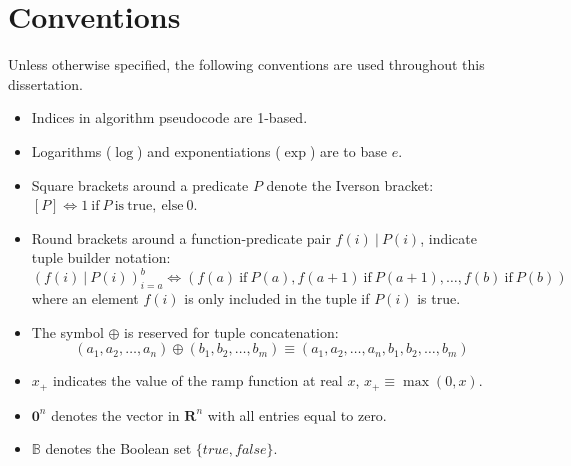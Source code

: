 \chapter*{Conventions}
Unless otherwise specified, the following conventions are used throughout this dissertation.

\begin{itemize}
  \item Indices in algorithm pseudocode are 1-based.
  \item Logarithms ($\log$) and exponentiations ($\exp$) are to base $e$.
  \item Square brackets around a predicate $P$ denote the Iverson bracket: $\left[P\right] \Leftrightarrow 1\ \mathrm{if}\ P \mathrm{~is~true,~else}\ 0$.
  \item Round brackets around a function-predicate pair $f(i)~|~P(i)$, indicate tuple builder notation: 
  \[
  \left(f(i)~|~P(i)\right)_{i=a}^b \Leftrightarrow \left( f(a)~\mathrm{if}~P(a), f(a+1)~\mathrm{if}~P(a+1), \dots, f(b)~\mathrm{if}~P(b) \right)
  \]
  where an element $f(i)$ is only included in the tuple if $P(i)$ is true.
  \item The symbol $\oplus$ is reserved for tuple concatenation: 
  \[
  \left(a_1, a_2, \dots, a_n\right) \oplus \left(b_1, b_2, \dots, b_m\right) \equiv \left(a_1, a_2, \dots, a_n, b_1, b_2, \dots, b_m\right)
  \]
  \item $x_+$ indicates the value of the ramp function at real $x$, $x_+ \equiv \max(0, x)$.
  \item $\mathbf{0}^n$ denotes the vector in $\mathbf{R}^n$ with all entries equal to zero.
  \item $\mathbb{B}$ denotes the Boolean set $\{true, false\}$.
\end{itemize}
                                                                 